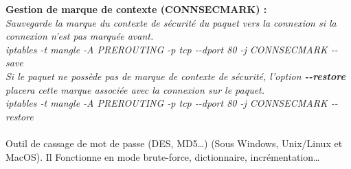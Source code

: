 \documentclass[a4paper,11pt]{article}				    %
\begin{document}
{\textbf{Gestion de marque de contexte (CONNSECMARK) : }\\
\textit{Sauvegarde la marque du contexte de s\'ecurit\'e du paquet vers la connexion si la connexion n'est pas marqu\'ee avant.}\\
{\sl \color{blue}iptables -t mangle -A PREROUTING -p tcp {-}{-}dport 80 -j CONNSECMARK {-}{-}save}\\
\textit{Si le paquet ne poss\`ede pas de marque de contexte de s\'ecurit\'e, l'option \textbf{{-}{-}restore} placera cette marque associ\'ee avec la connexion sur le paquet.}\\
{\sl \color{blue}iptables -t mangle -A PREROUTING -p tcp {-}{-}dport 80 -j CONNSECMARK {-}{-}restore}\\
}
{
\\Outil de cassage de mot de passe (DES, MD5\dots{}) (Sous Windows, Unix/Linux et MacOS). Il Fonctionne en mode brute-force, dictionnaire, incr\'ementation\dots{}
}
\end{document}
